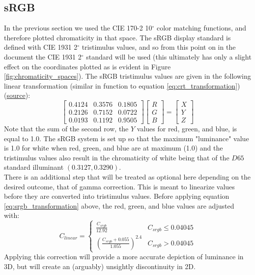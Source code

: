 \documentclass[twocolumn]{article}
\begin{document}
\subsection{sRGB}
In the previous section we used the CIE 170-2 10$^\circ$ color matching functions, and therefore plotted chromaticity in that space.  The sRGB display standard is defined with CIE 1931 2$^\circ$ tristimulus values, and so from this point on in the document the CIE 1931 2$^\circ$ standard will be used (this ultimately has only a slight effect on the coordinates plotted as is evident in Figure \ref{fig:chromaticity_spaces}).  The sRGB tristimulus values are given in the following linear transformation (similar in function to equation \ref{eq:crt_transformation}) (\href{https://en.wikipedia.org/wiki/SRGB}{source}):
\begin{equation}\label{eq:srgb_transformation}
    \begin{bmatrix}
        0.4124&0.3576&0.1805\\
        0.2126&0.7152&0.0722\\
        0.0193&0.1192&0.9505
    \end{bmatrix}\begin{bmatrix}
        R\\
        G\\
        B
    \end{bmatrix}=\begin{bmatrix}
        X\\
        Y\\
        Z
    \end{bmatrix}
\end{equation}
Note that the sum of the second row, the $Y$ values for red, green, and blue, is equal to 1.0.  The sRGB system is set up so that the maximum "luminance" value is 1.0 for white when red, green, and blue are at maximum (1.0) and the tristimulus values also result in the chromaticity of white being that of the $D65$ standard illuminant $(0.3127,0.3290)$.\\

There is an additional step that will be treated as optional here depending on the desired outcome, that of gamma correction.  This is meant to linearize values before they are converted into tristimulus values.  Before applying equation \ref{eq:srgb_transformation} above, the red, green, and blue values are adjusted with:
\begin{equation}\label{eq:gamma_correction}
    C_{linear}=\left\{\begin{array}{ll}
        \frac{C_{srgb}}{12.92}&C_{srgb}\leq0.04045\\
        \left(\frac{C_{srgb}+0.055}{1.055}\right)^{2.4}&C_{srgb}>0.04045
    \end{array}\right.
\end{equation}
Applying this correction will provide a more accurate depiction of luminance in 3D, but will create an (arguably) unsightly discontinuity in 2D.
\end{document}
